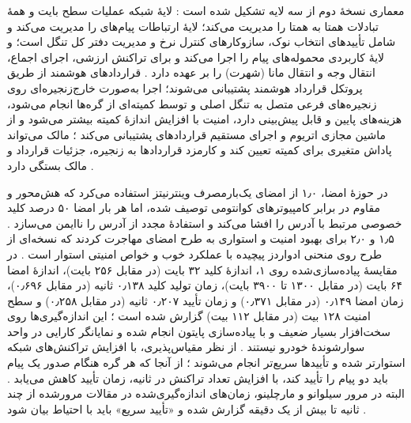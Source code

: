معماری  نسخهٔ دوم از سه لایه تشکیل شده است \cite{IOTATANGLE20, sealeyIOTATangle202022}: لایهٔ شبکه عملیات سطح بایت و همهٔ تبادلات همتا به همتا را مدیریت می‌کند؛ لایهٔ ارتباطات پیام‌های  را مدیریت می‌کند و شامل تأییدهای انتخاب نوک، سازوکارهای کنترل نرخ و مدیریت دفتر کل تنگل است؛ و لایهٔ کاربردی محموله‌های پیام را اجرا می‌کند و برای تراکنش ارزشی، اجرای اجماع، انتقال وجه و انتقال مانا (شهرت) را بر عهده دارد \cite{IOTATANGLE20, sealeyIOTATangle202022}. قراردادهای هوشمند از طریق پروتکل قرارداد هوشمند  پشتیبانی می‌شوند؛ اجرا به‌صورت خارج‌زنجیره‌ای روی زنجیره‌های فرعی متصل به تنگل اصلی و توسط کمیته‌ای از گره‌ها انجام می‌شود، هزینه‌های پایین و قابل پیش‌بینی دارد، امنیت با افزایش اندازهٔ کمیته بیشتر می‌شود و از ماشین مجازی اتریوم و اجرای مستقیم قراردادهای  پشتیبانی می‌کند \cite{IOTATANGLE20, sealeyIOTATangle202022}؛ مالک می‌تواند پاداش متغیری برای کمیته تعیین کند و کارمزد قراردادها به زنجیره، جزئیات قرارداد و مالک بستگی دارد \cite{IOTATANGLE20}.

در حوزهٔ امضا،  ۱٫۰ از امضای یک‌بارمصرف وینترنیتز استفاده می‌کرد که هش‌محور و مقاوم در برابر کامپیوترهای کوانتومی توصیف شده، اما هر بار امضا ۵۰ درصد کلید خصوصی مرتبط با آدرس را افشا می‌کند و استفادهٔ مجدد از آدرس را ناایمن می‌سازد \cite{silvanoIotaTangleCryptocurrency2020}.  ۱٫۵ و ۲٫۰ برای بهبود امنیت و استواری به طرح امضای  مهاجرت کردند \cite{IOTATANGLE20} که نسخه‌ای از طرح  روی منحنی ادواردز پیچیده با عملکرد خوب و خواص امنیتی استوار است \cite{IOTATANGLE20}. در مقایسهٔ پیاده‌سازی‌شده روی  ۱، اندازهٔ کلید ۳۲ بایت (در مقابل ۲۵۶ بایت)، اندازهٔ امضا ۶۴ بایت (در مقابل ۱۳۰۰ تا ۳۹۰۰ بایت)، زمان تولید کلید ۰٫۱۳۸ ثانیه (در مقابل ۰٫۶۹۶)، زمان امضا ۰٫۱۴۹ (در مقابل ۰٫۳۷۱) و زمان تأیید ۰٫۲۰۷ ثانیه (در مقابل ۰٫۲۵۸) و سطح امنیت ۱۲۸ بیت (در مقابل ۱۱۲ بیت) گزارش شده است \cite{IOTATANGLE20}؛ این اندازه‌گیری‌ها روی سخت‌افزار بسیار ضعیف و با پیاده‌سازی پایتون انجام شده و نمایانگر کارایی در واحد سوارشوندهٔ خودرو نیستند \cite{IOTATANGLE20}. از نظر مقیاس‌پذیری، با افزایش تراکنش‌های  شبکه استوارتر شده و تأییدها سریع‌تر انجام می‌شوند \cite{IOTATANGLE20}؛ از آنجا که هر گره هنگام صدور یک پیام باید دو پیام را تأیید کند، با افزایش تعداد تراکنش در ثانیه، زمان تأیید کاهش می‌یابد \cite{sealeyIOTATangle202022}. البته در مرور سیلوانو و مارچلینو، زمان‌های اندازه‌گیری‌شده در مقالات مرورشده از چند ثانیه تا بیش از یک دقیقه گزارش شده و «تأیید سریع» باید با احتیاط بیان شود \cite{silvanoIotaTangleCryptocurrency2020}.

